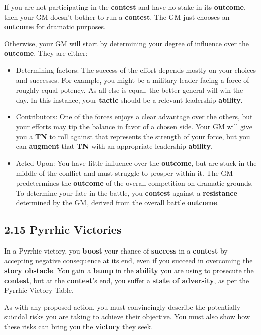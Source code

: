 \documentclass[
]{article}
\providecommand{\tightlist}{%
  \setlength{\itemsep}{0pt}\setlength{\parskip}{0pt}}
\begin{document}
If you are not participating in the \textbf{contest} and have no stake
in its \textbf{outcome}, then your GM doesn't bother to run a
\textbf{contest}. The GM just chooses an \textbf{outcome} for dramatic
purposes.

Otherwise, your GM will start by determining your degree of influence
over the \textbf{outcome}. They are either:

\begin{itemize}
\tightlist
\item
  Determining factors: The success of the effort depends mostly on your
  choices and successes. For example, you might be a military leader
  facing a force of roughly equal potency. As all else is equal, the
  better general will win the day. In this instance, your
  \textbf{tactic} should be a relevant leadership \textbf{ability}.
\item
  Contributors: One of the forces enjoys a clear advantage over the
  others, but your efforts may tip the balance in favor of a chosen
  side. Your GM will give you a \textbf{TN} to roll against that
  represents the strength of your force, but you can \textbf{augment}
  that \textbf{TN} with an appropriate leadership \textbf{ability}.
\item
  Acted Upon: You have little influence over the \textbf{outcome}, but
  are stuck in the middle of the conflict and must struggle to prosper
  within it. The GM predetermines the \textbf{outcome} of the overall
  competition on dramatic grounds. To determine your fate in the battle,
  you \textbf{contest} against a \textbf{resistance} determined by the
  GM, derived from the overall battle \textbf{outcome}.
\end{itemize}

\hypertarget{pyrrhic-victories}{%
\subsection{2.15 Pyrrhic Victories}\label{pyrrhic-victories}}

In a Pyrrhic victory, you \textbf{boost} your chance of \textbf{success}
in a \textbf{contest} by accepting negative consequence at its end, even
if you succeed in overcoming the \textbf{story obstacle}. You gain a
\textbf{bump} in the \textbf{ability} you are using to prosecute the
\textbf{contest}, but at the \textbf{contest}'s end, you suffer a
\textbf{state of adversity}, as per the Pyrrhic Victory Table.

As with any proposed action, you must convincingly describe the
potentially suicidal risks you are taking to achieve their objective.
You must also show how these risks can bring you the \textbf{victory}
they seek.
\end{document}
